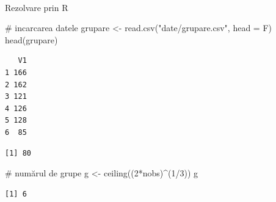 \documentclass[
  11pt,
  b5paper,
  nottoc]{book}
\makeatletter
\let\oldparagraph\paragraph
\renewcommand{\paragraph}{
    \@ifstar
      \xxxParagraphStar
      \xxxParagraphNoStar
  }
\newcommand{\xxxParagraphStar}[1]{\oldparagraph*{#1}\mbox{}}
\newcommand{\xxxParagraphNoStar}[1]{\oldparagraph{#1}\mbox{}}
\newenvironment{Shaded}{\begin{snugshade}}{\end{snugshade}}
\newcommand{\AttributeTok}[1]{\textcolor[rgb]{0.40,0.45,0.13}{#1}}
\newcommand{\CommentTok}[1]{\textcolor[rgb]{0.37,0.37,0.37}{#1}}
\newcommand{\DecValTok}[1]{\textcolor[rgb]{0.68,0.00,0.00}{#1}}
\newcommand{\FunctionTok}[1]{\textcolor[rgb]{0.28,0.35,0.67}{#1}}
\newcommand{\NormalTok}[1]{\textcolor[rgb]{0.00,0.23,0.31}{#1}}
\newcommand{\OtherTok}[1]{\textcolor[rgb]{0.00,0.23,0.31}{#1}}
\newcommand{\SpecialCharTok}[1]{\textcolor[rgb]{0.37,0.37,0.37}{#1}}
\newcommand{\StringTok}[1]{\textcolor[rgb]{0.13,0.47,0.30}{#1}}
\makeatother
\begin{document}
\paragraph{Rezolvare prin R}\label{rezolvare-prin-r-1}

\begin{Shaded}
\begin{Highlighting}[]
\CommentTok{\# incarcarea datele}
\NormalTok{grupare }\OtherTok{\textless{}{-}} \FunctionTok{read.csv}\NormalTok{(}\StringTok{"date/grupare.csv"}\NormalTok{, }\AttributeTok{head =}\NormalTok{ F)}
\FunctionTok{head}\NormalTok{(grupare)}
\end{Highlighting}
\end{Shaded}

\begin{verbatim}
   V1
1 166
2 162
3 121
4 126
5 128
6  85
\end{verbatim}

\begin{Shaded}
\end{Shaded}

\begin{verbatim}
[1] 80
\end{verbatim}

\begin{Shaded}
\begin{Highlighting}[]
\CommentTok{\# numărul de grupe}
\NormalTok{g }\OtherTok{\textless{}{-}} \FunctionTok{ceiling}\NormalTok{((}\DecValTok{2}\SpecialCharTok{*}\NormalTok{nobs)}\SpecialCharTok{\^{}}\NormalTok{(}\DecValTok{1}\SpecialCharTok{/}\DecValTok{3}\NormalTok{))}
\NormalTok{g}
\end{Highlighting}
\end{Shaded}

\begin{verbatim}
[1] 6
\end{verbatim}

\begin{Shaded}
\end{Shaded}
\end{document}
